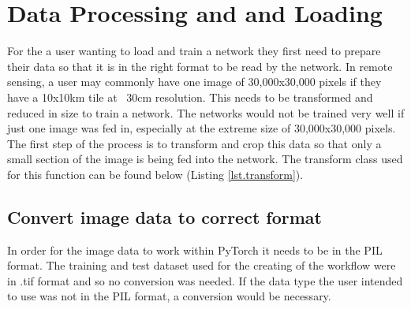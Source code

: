 \section{Data Processing and and Loading}
For the a user wanting to load and train a network they first need to prepare their data so that it is in the right format to be read by the network. In remote sensing, a user may commonly have one image of 30,000x30,000 pixels if they have a 10x10km tile at ~30cm resolution. This needs to be transformed and reduced in size to train a network. The networks would not be trained very well if just one image was fed in, especially at the extreme size of 30,000x30,000 pixels. The first step of the process is to transform and crop this data so that only a small section of the image is being fed into the network. The transform class used for this function can be found below (Listing \ref{lst.transform}).
\subsection{Convert image data to correct format}
In order for the image data to work within PyTorch it needs to be in the PIL format. The training and test dataset used for the creating of the workflow were in .tif format and so no conversion was needed. If the data type the user intended to use was not in the PIL format, a conversion would be necessary.

